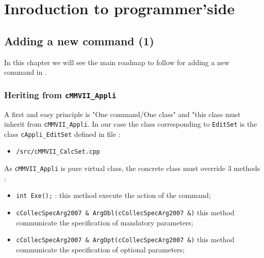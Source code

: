 


\chapter{Inroduction to programmer'side}



\section{Adding a new command (1)}

In this chapter we will see the main roadmap to follow for
adding a new command in \PPP.



\subsection{Heriting from  {\tt cMMVII\_Appli}}

A first and easy principle is "One command/One class" and  "this class must
inherit from {\tt cMMVII\_Appli}.
In our case the class corresponding to {\tt EditSet} is the class {\tt cAppli\_EditSet}
defined in file :

\begin{itemize}
   \item  {\tt \MMVIDIR/src/cMMVII\_CalcSet.cpp}
\end{itemize}
As {\tt cMMVII\_Appli} is pure virtual class, the concrete class must override
$3$ methods :

\begin{itemize}
   \item {\tt int Exe();} : this method execute the action of the command;

   \item {\tt cCollecSpecArg2007 \& ArgObl(cCollecSpecArg2007 \&)} this method communicate the specification
         of mandatory parameters;

   \item {\tt cCollecSpecArg2007 \& ArgOpt(cCollecSpecArg2007 \&)} this method communicate the specification
         of optional parameters;
\end{itemize}


